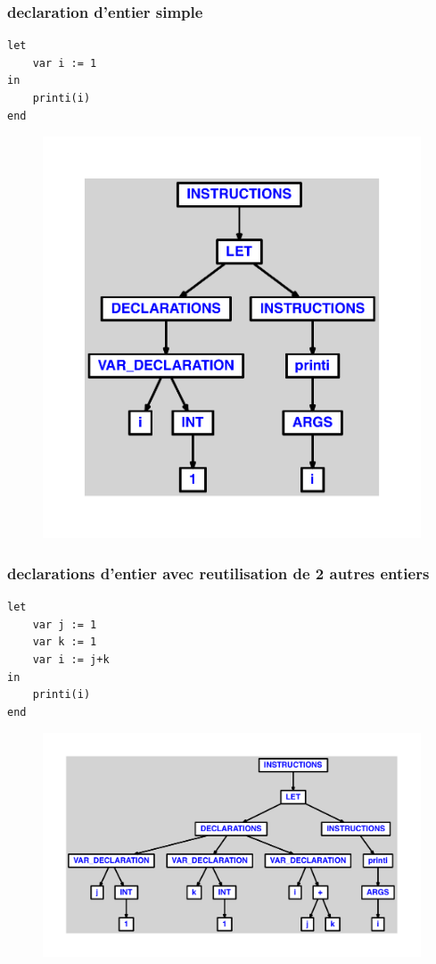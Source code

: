 \documentclass{article}
\begin{document}
\subsubsection{declaration d'entier simple}
\begin{lstlisting}let
	var i := 1
in
	printi(i)
end
\end{lstlisting}
\newpage
\begin{figure}[H]
\centering
\includegraphics[max width=\textwidth]{ast/ast_303.pdf}
\end{figure}
\newpage
\subsubsection{declarations d'entier avec reutilisation de 2 autres entiers}
\begin{lstlisting}
let
	var j := 1
	var k := 1
	var i := j+k
in
	printi(i)
end
\end{lstlisting}
\newpage
\begin{figure}[H]
\centering
\includegraphics[max width=\textwidth]{ast/ast_304.pdf}
\end{figure}
\newpage
\end{document}

